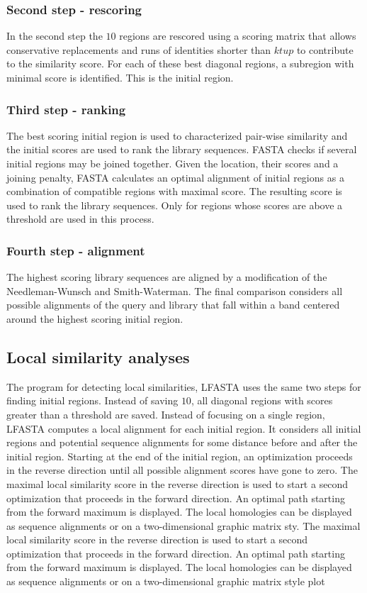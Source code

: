 		\subsubsection{Second step - rescoring}
		In the second step the $10$ regions are rescored using a scoring matrix that allows conservative replacements and runs of identities shorter than $ktup$ to contribute to the similarity score.
		For each of these best diagonal regions, a subregion with minimal score is identified.
		This is the initial region.

		\subsubsection{Third step - ranking}
		The best scoring initial region is used to characterized pair-wise similarity and the initial scores are used to rank the library sequences.
		FASTA checks if several initial regions may be joined together.
		Given the location, their scores and a joining penalty, FASTA calculates an optimal alignment of initial regions as a combination of compatible regions with maximal score.
		The resulting score is used to rank the library sequences.
		Only for regions whose scores are above a threshold are used in this process.

		\subsubsection{Fourth step - alignment}
		The highest scoring library sequences are aligned by a modification of the Needleman-Wunsch and Smith-Waterman.
		The final comparison considers all possible alignments of the query and library that fall within a band centered around the highest scoring initial region.

	\subsection{Local similarity analyses}
	The program for detecting local similarities, LFASTA uses the same two steps for finding initial regions.
	Instead of saving $10$, all diagonal regions with scores greater than a threshold are saved.
	Instead of focusing on a single region, LFASTA computes a local alignment for each initial region.
	It considers all initial regions and potential sequence alignments for some distance before and after the initial region.
	Starting at the end of the initial region, an optimization proceeds in the reverse direction until all possible alignment scores have gone to zero.
	The maximal local similarity score in the reverse direction is used to start a second optimization that proceeds in the forward direction.
	An optimal path starting from the forward maximum is displayed.
	The local homologies can be displayed as sequence alignments or on a two-dimensional graphic matrix sty.
	The maximal local similarity score in the reverse direction is used to start a second optimization that proceeds in the forward direction.
	An optimal path starting from the forward maximum is displayed.
	The local homologies can be displayed as sequence alignments or on a two-dimensional graphic matrix style plot

